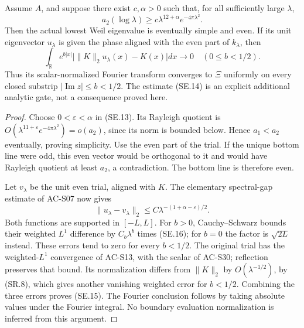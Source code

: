 \begin{corollary}
\label{AC-S33}
Assume $A$, and suppose there exist $c,\alpha>0$
such that, for all sufficiently large $\lambda$,
\[
 a_2(\log\lambda)\geq
                   c\lambda^{12+\alpha}e^{-4\pi\lambda^2}.
                                                        \tag{SE.14}
\]
Then the actual lowest Weil eigenvalue is eventually
simple and even.  If its unit eigenvector $u_\lambda$
is given the phase aligned with the even part of
$k_\lambda$, then
\[
 \int_{\mathbb R}e^{b|x|}
       \bigl|\|K\|_2u_\lambda(x)-K(x)\bigr|dx
                          \longrightarrow0
                         \quad(0\leq b<1/2).        \tag{SE.15}
\]
Thus its scalar-normalized Fourier transform converges
to $\Xi$ uniformly on every closed substrip
$|\operatorname{Im}z|\leq b<1/2$.
The estimate (SE.14) is an explicit additional analytic
gate, not a consequence proved here.
\end{corollary}
\begin{proof}
Choose $0<\varepsilon<\alpha$ in (SE.13).
Its Rayleigh quotient is $O(\lambda^{11+\varepsilon}
e^{-4\pi\lambda^2})=o(a_2)$, since its norm is bounded
below.  Hence $a_1<a_2$ eventually, proving simplicity.
Use the even part of the trial.  If the unique bottom
line were odd, this even vector would be orthogonal
to it and would have Rayleigh quotient at least $a_2$,
a contradiction.  The bottom line is therefore even.

Let $v_\lambda$ be the unit even trial, aligned with
$K$.  The elementary spectral-gap estimate of AC-S07
now gives
\[
 \|u_\lambda-v_\lambda\|_2
          \leq C\lambda^{-(1+\alpha-\varepsilon)/2}.\tag{SE.16}
\]
Both functions are supported in $[-L,L]$.
For $b>0$, Cauchy--Schwarz bounds their weighted
$L^1$ difference by $C_b\lambda^b$ times (SE.16);
for $b=0$ the factor is $\sqrt{2L}$ instead.
These errors tend to zero for every $b<1/2$.
The original trial has the weighted-$L^1$ convergence
of AC-S13, with the scalar of AC-S30; reflection
preserves that bound.  Its normalization differs
from $\|K\|_2$ by $O(\lambda^{-1/2})$, by (SR.8),
which gives another vanishing weighted error for
$b<1/2$.  Combining the three errors proves (SE.15).
The Fourier conclusion follows by taking absolute
values under the Fourier integral.  No boundary
evaluation normalization is inferred from this argument.
\end{proof}
